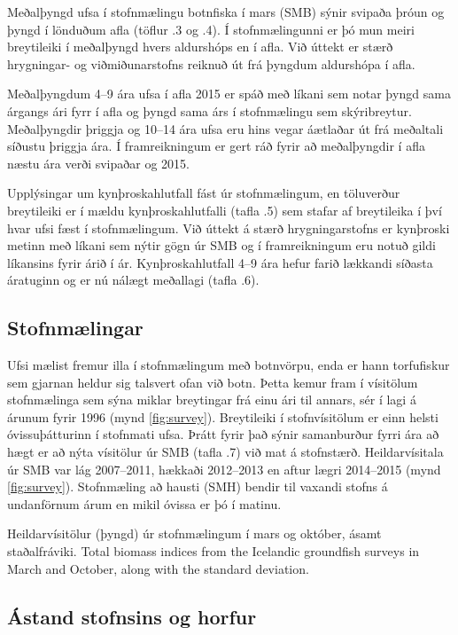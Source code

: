 \documentclass{hafrorep}
\begin{document}
Meðalþyngd ufsa í stofnmælingu botnfiska í mars (SMB) sýnir svipaða þróun og
þyngd í lönduðum afla (töflur \tabsection.3 og \tabsection.4). Í stofnmælingunni
er þó mun meiri breytileiki í meðalþyngd hvers aldurshóps en í afla. Við úttekt
er stærð hrygningar- og viðmiðunarstofns reiknuð út frá þyngdum aldurshópa í
afla.

Meðalþyngdum 4--9 ára ufsa í afla 2015 er spáð með líkani sem notar þyngd sama
árgangs ári fyrr í afla og þyngd sama árs í stofnmælingu sem skýribreytur.
Meðalþyngdir þriggja og 10--14 ára ufsa eru hins vegar áætlaðar út frá meðaltali
síðustu þriggja ára. Í framreikningum er gert ráð fyrir að meðalþyngdir í afla
næstu ára verði svipaðar og 2015.

Upplýsingar um kynþroskahlutfall fást úr stofnmælingum, en töluverður
breytileiki er í mældu kynþroskahlutfalli (tafla \tabsection.5) sem stafar af
breytileika í því hvar ufsi fæst í stofnmælingum. Við úttekt á stærð
hrygningarstofns er kynþroski metinn með líkani sem nýtir gögn úr SMB og í
framreikningum eru notuð gildi líkansins fyrir árið í ár. Kynþroskahlutfall 4--9
ára hefur farið lækkandi síðasta áratuginn og er nú nálægt meðallagi (tafla
\tabsection.6).

\subsection{Stofnmælingar}

Ufsi mælist fremur illa í stofnmælingum með botnvörpu, enda er hann torfufiskur
sem gjarnan heldur sig talsvert ofan við botn. Þetta kemur fram í vísitölum
stofnmælinga sem sýna miklar breytingar frá einu ári til annars, sér í lagi á
árunum fyrir 1996 (mynd \ref{fig:survey}). Breytileiki í stofnvísitölum er einn
helsti óvissuþátturinn í stofnmati ufsa. Þrátt fyrir það sýnir samanburður fyrri
ára að hægt er að nýta vísitölur úr SMB (tafla \tabsection.7) við mat á
stofnstærð. Heildarvísitala úr SMB var lág 2007--2011, hækkaði 2012--2013 en
aftur lægri 2014--2015 (mynd \ref{fig:survey}). Stofnmæling að hausti (SMH)
bendir til vaxandi stofns á undanförnum árum en mikil óvissa er þó í matinu.

{Heildarvísitölur (þyngd) úr stofnmælingum í mars og október, ásamt
  staðalfráviki.}
{Total biomass indices from the Icelandic groundfish surveys in March and
  October, along with the standard deviation.}

\subsection{Ástand stofnsins og horfur}
\end{document}
